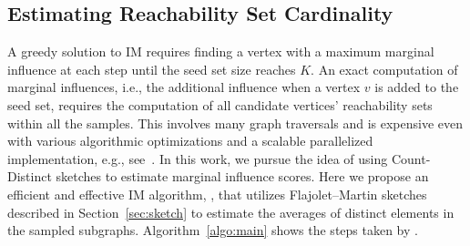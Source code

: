 \subsection{Estimating Reachability Set Cardinality}
A greedy solution to IM requires finding a vertex with a maximum marginal influence at each step until the seed set size reaches $K$.
An exact computation of marginal influences, i.e., the additional influence when a vertex $v$ is added to the seed set, requires the computation of all candidate vertices' reachability sets within all the samples. This involves many graph traversals and is expensive even with various algorithmic optimizations and a scalable parallelized implementation, e.g., see~\cite{infuser}. %
In this work, we pursue the idea of using Count-Distinct sketches to estimate marginal influence scores. Here we propose an efficient and effective IM algorithm, \acro, that utilizes Flajolet–Martin sketches described in Section~\ref{sec:sketch} to estimate the averages of distinct elements in the sampled subgraphs. Algorithm~\ref{algo:main} shows the steps taken by \acro.

